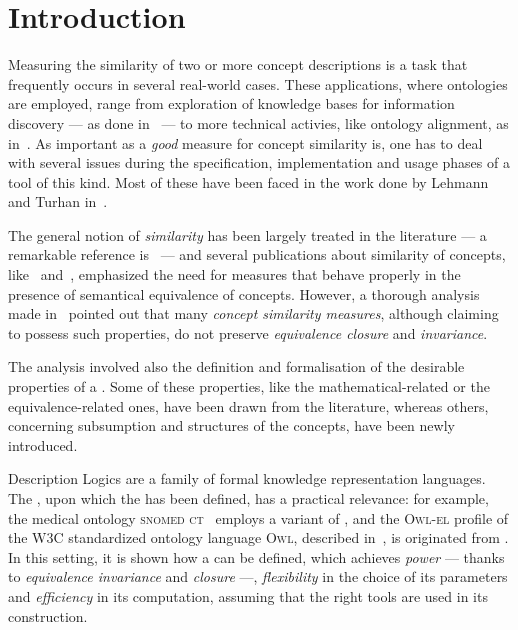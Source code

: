 \section{Introduction}
\label{sec:intro}

Measuring the similarity of two or more concept descriptions is a task that frequently occurs in several real-world cases.
These applications, where ontologies are employed, range from exploration of knowledge bases for information discovery --- as done in~\cite{GF13} --- to more technical activies, like ontology alignment, as in~\cite{CHu11}.
As important as a \emph{good} measure for concept similarity is, one has to deal with several issues during the specification, implementation and usage phases of a tool of this kind.
Most of these have been faced in the work done by Lehmann and Turhan in~\cite{LeTu12}.

The general notion of \emph{similarity} has been largely treated in the literature --- a remarkable reference is~\cite{Tve77} --- and several publications about similarity of concepts, like~\cite{SemSim} and~\cite{dSF08}, emphasized the need for measures that behave properly in the presence of semantical equivalence of concepts.
However, a thorough analysis made in~\cite{LeTu12} pointed out that many \emph{concept similarity measures}, although claiming to possess such properties, do not preserve \emph{equivalence closure} and \emph{invariance}.

The analysis involved also the definition and formalisation of the desirable properties of a \csm.
Some of these properties, like the mathematical-related or the equivalence-related ones, have been drawn from the literature, whereas others, concerning subsumption and structures of the concepts, have been newly introduced.

Description Logics are a family of formal knowledge representation languages.
The \dl \elh, upon which the \csm \simi has been defined, has a practical relevance: for example, the medical ontology \textsc{snomed ct}~\cite{snomed} employs a variant of \elh, and the \textsc{Owl-el} profile of the W3C standardized ontology language \textsc{Owl}, described in~\cite{owlEL}, is originated from \elh.
In this setting, it is shown how a \csm can be defined, which achieves \emph{power} --- thanks to \emph{equivalence invariance} and \emph{closure} ---, \emph{flexibility} in the choice of its parameters and \emph{efficiency} in its computation, assuming that the right tools are used in its construction.

